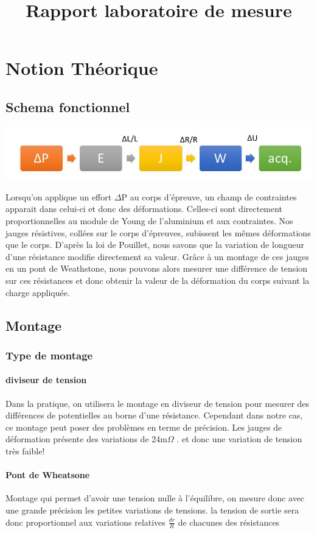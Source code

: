 \documentclass[11pt,a4paper]{report}
\begin{document}
\title{Rapport laboratoire de mesure}
\part{Notion Théorique}
\chapter{Schema fonctionnel}
\begin{center}
\includegraphics[scale=0.5]{image1.jpg} 
\end{center}

Lorsqu'on applique un effort $\Delta$P au corps d'épreuve, un champ de contraintes apparait dans celui-ci et donc des déformations. Celles-ci sont directement proportionnelles au module de Young de l'aluminium et aux contraintes. Nos jauges résistives, collées sur le corps d'épreuves, subissent les mêmes déformations que le corps. D'après la loi de Pouillet, nous savons que la variation de longueur d'une résistance modifie directement sa valeur. Grâce à un montage de ces jauges en un pont de Weathstone, nous pouvons alors mesurer une différence de tension sur ces résistances et donc obtenir la valeur de la déformation du corps suivant la charge appliquée.

\chapter{Montage}
\section{Type de montage}
\subsection{diviseur de tension}
Dans la pratique, on utilisera le montage en diviseur de tension pour mesurer des différences de potentielles au borne d'une résistance. Cependant dans notre cas, ce montage peut poser des problèmes en terme de précision. Les jauges de déformation présente des variations de 24m$\Omega$ . et donc une variation de tension très faible!
\subsection{Pont de Wheatsone}
Montage qui permet d'avoir une tension nulle à l'équilibre, on mesure donc avec une grande précision les petites variations de tensions. la tension de sortie sera donc proportionnel aux variations relatives $\frac{dr}{R}$ de chacunes des résistances
\end{document}
